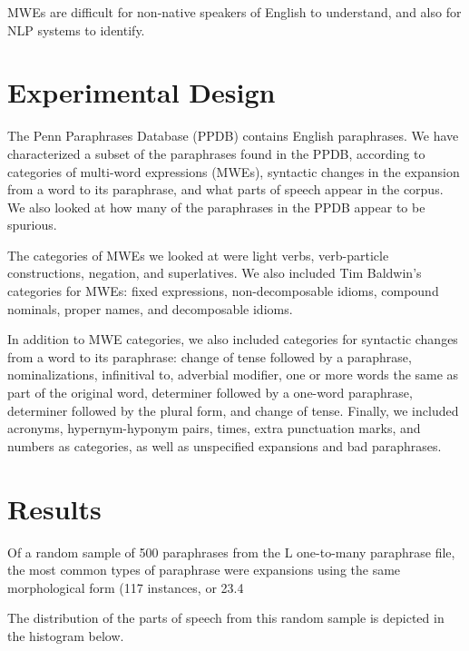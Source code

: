 \documentclass[11pt]{article}
\begin{document}
MWEs are difficult for non-native speakers of English to understand, and also for NLP systems to identify. 


\section{Experimental Design}
The Penn Paraphrases Database (PPDB) contains English paraphrases. We have characterized a subset of the paraphrases found in the PPDB, according to categories of multi-word expressions (MWEs), syntactic changes in the expansion from a word to its paraphrase, and what parts of speech appear in the corpus. We also looked at how many of the paraphrases in the PPDB appear to be spurious.

The categories of MWEs we looked at were light verbs, verb-particle constructions, negation, and superlatives. We also included Tim Baldwin's categories for MWEs: fixed expressions, non-decomposable idioms, compound nominals, proper names, and decomposable idioms. 

In addition to MWE categories, we also included categories for syntactic changes from a word to its paraphrase: change of tense followed by a paraphrase, nominalizations, infinitival to, adverbial modifier, one or more words the same as part of the original word, determiner followed by a one-word paraphrase, determiner followed by the plural form, and change of tense. Finally, we included acronyms, hypernym-hyponym pairs, times, extra punctuation marks, and numbers as categories, as well as unspecified expansions and bad paraphrases.

\section{Results}

Of a random sample of 500 paraphrases from the L one-to-many paraphrase file, the most common types of paraphrase were expansions using the same morphological form (117 instances, or 23.4%

The distribution of the parts of speech from this random sample is depicted in the histogram below. 
\end{document}
